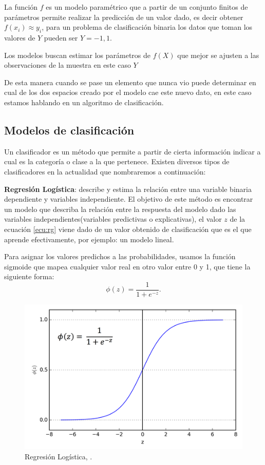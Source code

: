 La función $f$ es un modelo paramétrico que a partir de un conjunto finitos de parámetros permite realizar la predicción de un valor dado, es decir obtener  $f(x_i) ≈ y_i$, para un problema de clasificación binaria los datos que toman los valores de $Y$ pueden ser $Y={-1, 1}$. 


Los modelos buscan estimar los parámetros de $f(X)$ que mejor se ajusten a las observaciones de la muestra en este caso $Y$






 De esta manera cuando se pase un elemento que nunca vio puede determinar en cual de los dos espacios creado por el modelo cae este nuevo dato, en este caso estamos hablando en un algoritmo de clasificación.


\subsection{Modelos de clasificación}\label{sub:clasificadores}

Un clasificador es un método que permite a partir de cierta información indicar a cual es la categoría o clase a la que pertenece. Existen diversos tipos de clasificadores en la actualidad que nombraremos a continuación:

\par \textbf{Regresión Logística}: describe y estima la relación entre una variable binaria dependiente y variables independiente. El objetivo de este método es encontrar un modelo que describa la relación entre la respuesta del modelo dado las variables independientes(variables predictivas o explicativas), el valor $z$ de la ecuación \ref {ecu:rg} viene dado de un valor obtenido de clasificación que es el que aprende efectivamente, por ejemplo: un modelo lineal.

Para asignar los valores predichos a las probabilidades, usamos la función sigmoide que mapea cualquier valor real en otro valor entre 0 y 1, que tiene la siguiente forma:
\begin{equation}\label{ecu:rg}
\phi(z) = \frac{1}{1+e^{-z}}.
\end{equation}

\begin{figure}[H]
 \centering
  \includegraphics[scale=0.5]{imagenes/MarcoTeorico/sigmoide.png}
  \caption{Regresión Logística, \citep{bishop}.}
  \label{Fig: log_reg}
\end{figure}


